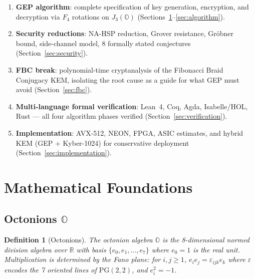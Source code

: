 \documentclass[11pt,letterpaper]{article}
\newtheorem{definition}[theorem]{Definition}
\theoremstyle{definition}
\begin{document}
\begin{enumerate}[nosep]
\item \textbf{GEP algorithm}: complete specification of key generation,
  encryption, and decryption via $F_4$ rotations on $J_3(\mathbb{O})$
  (Sections~\ref{sec:algebra}--\ref{sec:algorithm}).

\item \textbf{Security reductions}: NA-HSP reduction, Grover resistance,
  Gr\"obner bound, side-channel model, 8 formally stated conjectures
  (Section~\ref{sec:security}).

\item \textbf{FBC break}: polynomial-time cryptanalysis of the Fibonacci Braid
  Conjugacy KEM, isolating the root cause as a guide for what GEP must avoid
  (Section~\ref{sec:fbc}).

\item \textbf{Multi-language formal verification}: Lean~4, Coq, Agda,
  Isabelle/HOL, Rust — all four algorithm phases verified
  (Section~\ref{sec:verification}).

\item \textbf{Implementation}: AVX-512, NEON, FPGA, ASIC estimates, and
  hybrid KEM (GEP + Kyber-1024) for conservative deployment
  (Section~\ref{sec:implementation}).
\end{enumerate}

\section{Mathematical Foundations}
\label{sec:algebra}

\subsection{Octonions $\mathbb{O}$}

\begin{definition}[Octonions]
The octonion algebra $\mathbb{O}$ is the 8-dimensional normed division algebra
over $\mathbb{R}$ with basis $\{e_0, e_1, \ldots, e_7\}$ where $e_0 = 1$
is the real unit.  Multiplication is determined by the \emph{Fano plane}:
for $i,j \geq 1$, $e_i e_j = \varepsilon_{ijk} e_k$ where $\varepsilon$
encodes the 7 oriented lines of $\mathrm{PG}(2,2)$, and $e_i^2 = -1$.
\end{definition}
\end{document}
